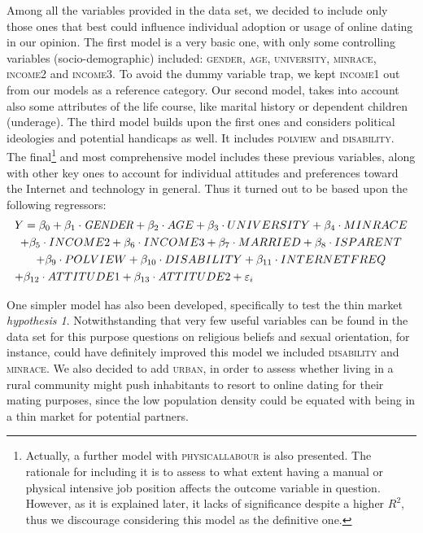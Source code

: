 Among all the variables provided in the data set, we decided to include
only those ones that best could influence individual adoption or usage
of online dating in our opinion. The first model is a very basic one,
with only some controlling variables (socio-demographic) included:
\textsc{gender}, \textsc{age}, \textsc{university}, \textsc{minrace},
\textsc{income2} and \textsc{income3}. To avoid the dummy variable
trap, we kept \textsc{income1} out from our models as a reference
category. Our second model, takes into account also some attributes
of the life course, like marital history or dependent children (underage).
The third model builds upon the first ones and considers political
ideologies and potential handicaps as well. It includes \textsc{polview}
and \textsc{disability}. The final\footnote{Actually, a further model with \textsc{physicallabour} is also presented.
The rationale for including it is to assess to what extent having
a manual or physical intensive job position affects the outcome variable
in question. However, as it is explained later, it lacks of significance
despite a higher $R^{2}$, thus we discourage considering this model
as the definitive one. } and most comprehensive model includes these previous variables, along
with other key ones to account for individual attitudes and preferences
toward the Internet and technology in general. Thus it turned out
to be based upon the following regressors:
\begin{multline}
Y=\beta_{0}+\beta_{1}\cdot\mathtt{\mathsf{\mathit{GENDER}}}+\beta_{2}\cdot AGE+\beta_{3}\cdot UNIVERSITY+\beta_{4}\cdot MINRACE\\
+\beta_{5}\cdot INCOME2+\beta_{6}\cdot INCOME3+\beta_{7}\cdot MARRIED+\beta_{8}\cdot ISPARENT\\
+\beta_{9}\cdot POLVIEW+\beta_{10}\cdot DISABILITY+\beta_{11}\cdot INTERNETFREQ\\
+\beta_{12}\cdot ATTITUDE1+\beta_{13}\cdot ATTITUDE2+\varepsilon_{i}\qquad\hfill\label{eq:final-model}
\end{multline}

One simpler model has also been developed, specifically to test the
thin market \textsl{hypothesis 1}. Notwithstanding that very few
useful variables can be found in the data set for this purpose \textendash{}
questions on religious beliefs and sexual orientation, for instance,
could have definitely improved this model \textendash{} we included
\textsc{disability} and \textsc{minrace}. We also decided to add \textsc{urban,
}in order to assess whether living in a rural community might push
inhabitants to resort to online dating for their mating purposes,
since the low population density could be equated with being in a
thin market for potential partners.


